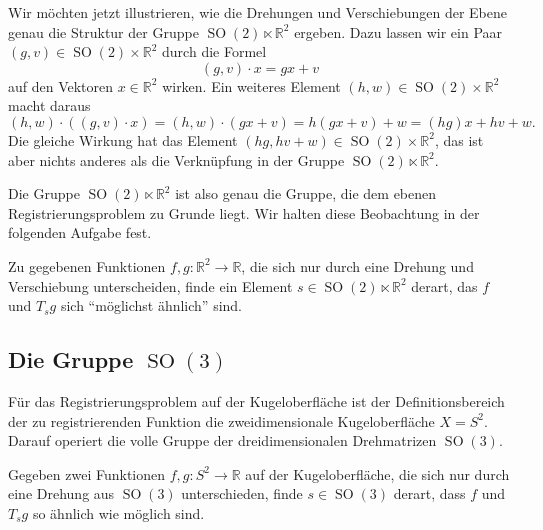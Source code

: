 Wir möchten jetzt illustrieren, wie die Drehungen und Verschiebungen
der Ebene genau die Struktur der Gruppe
$\operatorname{SO}(2)\ltimes\mathbb{R}^2$ ergeben.
Dazu lassen wir ein Paar $(g,v)\in\operatorname{SO}(2)\times \mathbb{R}^2$
durch die Formel
\[
(g,v)\cdot x
=
gx + v
\]
auf den Vektoren $x\in \mathbb{R}^2$ wirken.
Ein weiteres Element $(h,w)\in\operatorname{SO}(2)\times\mathbb{R}^2$
macht daraus
\[
(h,w)\cdot ((g,v)\cdot x)
=
(h,w)\cdot (gx+v)
=
h(gx+v)+w
=
(hg)x + hv + w.
\]
Die gleiche Wirkung hat das Element
$(hg, hv+w)\in\operatorname{SO}(2)\times\mathbb{R}^2$,
das ist aber nichts anderes als die Verknüpfung in der Gruppe
$\operatorname{SO}(2)\ltimes \mathbb{R}^2$.

Die Gruppe $\operatorname{SO}(2)\ltimes\mathbb{R}^2$ ist also genau
die Gruppe, die dem ebenen Registrierungsproblem zu Grunde liegt.
Wir halten diese Beobachtung in der folgenden Aufgabe fest.

\begin{aufgabe}
Zu gegebenen Funktionen $f,g\colon \mathbb{R}^2\to\mathbb{R}$, die sich
nur durch eine Drehung und Verschiebung unterscheiden, finde ein
Element $s\in\operatorname{SO}(2)\ltimes \mathbb{R}^2$ derart, das
$f$ und $T_sg$ sich ``möglichst ähnlich'' sind.
\end{aufgabe}

%
%
\subsection{Die Gruppe $\operatorname{SO}(3)$
\label{buch:nichtkomm:motivation:subsection:so3}}
Für das Registrierungsproblem auf der Kugeloberfläche ist der
Definitionsbereich der zu registrierenden Funktion die
zweidimensionale Kugeloberfläche $X=S^2$.
Darauf operiert die volle Gruppe der dreidimensionalen
Drehmatrizen $\operatorname{SO}(3)$.

\begin{aufgabe}
Gegeben zwei Funktionen $f,g\colon S^2\to\mathbb{R}$ auf der Kugeloberfläche,
die sich nur durch eine Drehung aus $\operatorname{SO}(3)$ unterschieden,
finde $s\in\operatorname{SO}(3)$ derart, dass $f$ und $T_sg$ so ähnlich
wie möglich sind.
\end{aufgabe}




